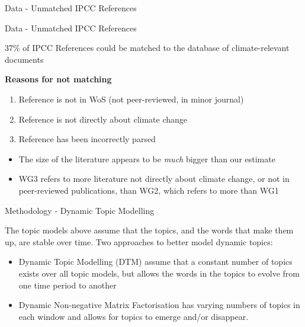 \documentclass[9pt]{beamer}
\begin{document}
\begin{frame}{Data - Unmatched IPCC References}
	\tiny
	
\end{frame}

\begin{frame}{Data - Unmatched IPCC References}

37\% of IPCC References could be matched to the database of climate-relevant documents

\medskip

\textbf{Reasons for not matching}
\begin{enumerate}
	\item<2->Reference is not in WoS (not peer-reviewed, in minor journal)
	\item<3->Reference is not directly about climate change
	\item<4->Reference has been incorrectly parsed
\end{enumerate}

\medskip

\begin{itemize}
	\item<5-> The size of the literature appears to be \textit{much} bigger than our estimate
	\item<6-> WG3 refers to more literature not directly about climate change, or not in peer-reviewed publications, than WG2, which refers to more than WG1
\end{itemize}

\end{frame}

\begin{frame}{Methodology - Dynamic Topic Modelling}

The topic models above assume that the topics, and the words that make them up, are stable over time. Two approaches to better model dynamic topics:

\begin{itemize}
	\item<2->Dynamic Topic Modelling (DTM) \citep{Blei2006} assume that a constant number of topics exists over all topic models, but allows the words in the topics to evolve from one time period to another
	\item<3->Dynamic Non-negative Matrix Factorisation \citep{Greene2016} has varying numbers of topics in each window and allows for topics to emerge and/or disappear.
\end{itemize}


\end{frame}
\end{document}
